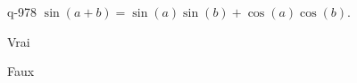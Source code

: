 \begin{truefalse}{q-978}
$\sin(a+b)=\sin(a)\sin(b)+\cos(a)\cos(b)$.
\item Vrai
\item* Faux
\end{truefalse}

